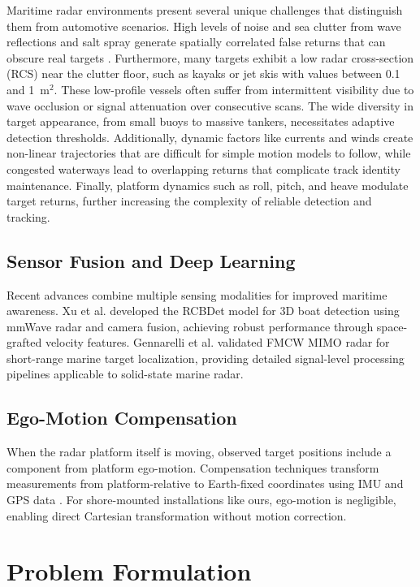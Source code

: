 \documentclass[conf]{new-aiaa}
\begin{document}
Maritime radar environments present several unique challenges that distinguish them from automotive scenarios. High levels of noise and sea clutter from wave reflections and salt spray generate spatially correlated false returns that can obscure real targets \cite{ward2013sea}. Furthermore, many targets exhibit a low radar cross-section (RCS) near the clutter floor, such as kayaks or jet skis with values between 0.1 and 1~m$^2$. These low-profile vessels often suffer from intermittent visibility due to wave occlusion or signal attenuation over consecutive scans. The wide diversity in target appearance, from small buoys to massive tankers, necessitates adaptive detection thresholds. Additionally, dynamic factors like currents and winds create non-linear trajectories that are difficult for simple motion models to follow, while congested waterways lead to overlapping returns that complicate track identity maintenance. Finally, platform dynamics such as roll, pitch, and heave modulate target returns, further increasing the complexity of reliable detection and tracking.

\subsection{Sensor Fusion and Deep Learning}
Recent advances combine multiple sensing modalities for improved maritime awareness. Xu et al. \cite{xu2025mmwave} developed the RCBDet model for 3D boat detection using mmWave radar and camera fusion, achieving robust performance through space-grafted velocity features. Gennarelli et al. \cite{gennarelli2022fmcw} validated FMCW MIMO radar for short-range marine target localization, providing detailed signal-level processing pipelines applicable to solid-state marine radar.

\subsection{Ego-Motion Compensation}
When the radar platform itself is moving, observed target positions include a component from platform ego-motion. Compensation techniques transform measurements from platform-relative to Earth-fixed coordinates using IMU and GPS data \cite{kellner2014egomotion}. For shore-mounted installations like ours, ego-motion is negligible, enabling direct Cartesian transformation without motion correction.

\section{Problem Formulation}
\end{document}

